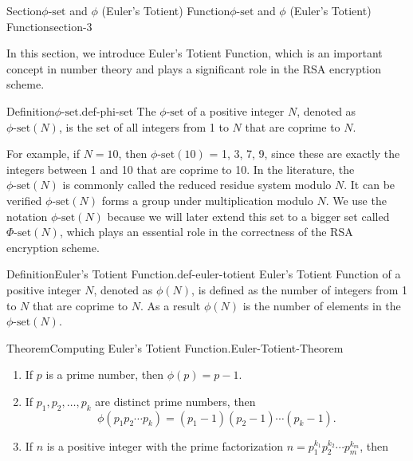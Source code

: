 \documentclass[oneside,12pt,]{article}
\numberwithin{equation}{section}
\begin{document}
\begin{sectionptx}{Section}{\(\phi\text{-set}\) and \(\phi\) (Euler's Totient) Function}{}{\(\phi\text{-set}\) and \(\phi\) (Euler's Totient) Function}{}{}{section-3}
\begin{introduction}{}%
In this section, we introduce Euler's Totient Function, which is an important concept in number theory and plays a significant role in the RSA encryption scheme.%
\end{introduction}%
\begin{definition}{Definition}{\(\phi\text{-set}\).}{def-phi-set}%
The \(\phi\text{-set}\) of a positive integer \(N\), denoted as \(\phi\text{-set}(N)\), is the set of all integers from 1 to \(N\) that are coprime to \(N\).%
\end{definition}
For example, if \(N = 10\), then \(\phi\text{-set}(10)\) = \textbraceleft{}1, 3, 7, 9\textbraceright{}, since these are exactly the integers between 1 and 10 that are coprime to 10. In the literature, the \(\phi\text{-set}(N)\) is commonly called the reduced residue system modulo \(N\). It can be verified \(\phi\text{-set}(N)\) forms a group under multiplication modulo \(N\). We use the notation \(\phi\text{-set}(N)\) because we will later extend this set to a bigger set called \(\Phi\text{-set}(N)\), which plays an essential role in the correctness of the RSA encryption scheme.%
\begin{definition}{Definition}{Euler's Totient Function.}{def-euler-totient}%
Euler's Totient Function of a positive integer \(N\), denoted as \(\phi(N)\), is defined as the number of integers from 1 to \(N\) that are coprime to \(N\). As a result \(\phi(N)\) is the number of elements in the \(\phi\text{-set}(N)\).%
\end{definition}
\begin{theorem}{Theorem}{Computing Euler's Totient Function.}{}{Euler-Totient-Theorem}%
%
\begin{enumerate}
\item{}If \(p\) is a prime number, then \(\phi(p) = p - 1\).%
\item{}If \(p_1, p_2, \ldots, p_k\) are distinct prime numbers, then%
\begin{equation*}
\phi(p_1 p_2 \cdots p_k) = (p_1 - 1)(p_2 - 1) \cdots (p_k - 1)\text{.}
\end{equation*}
%
\item{}If \(n\) is a positive integer with the prime factorization \(n = p_1^{k_1} p_2^{k_2} \cdots p_m^{k_m}\), then%
\begin{equation*}

\end{equation*}
\end{enumerate}
\end{theorem}
\end{sectionptx}
\end{document}
